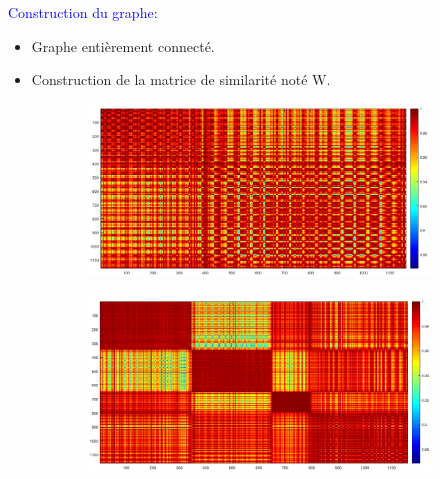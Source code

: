 \documentclass{beamer}
\begin{document}
\begin{frame}

\textcolor{blue}{Construction du graphe:}

\begin{itemize}
\item Graphe entièrement connecté.
\item Construction de la matrice de similarité noté W.
\end{itemize}

\begin{figure}[H]
\centering
\begin{subfigure}[t]{0.5\textwidth}
\centering
    \vspace{0.00\textheight}
    \includegraphics[scale=0.2,angle=0]{matrixAffinity2.png}
    \label{fig:without} 
\end{subfigure}
\begin{subfigure}[t]{0.5\textwidth}
\centering
    \vspace{0.00\textheight}
    \includegraphics[scale=0.2,angle=0]{matrixAffinity.png}
    \label{fig:First} 
\end{subfigure}
\end{figure}

\end{frame}
\end{document}
